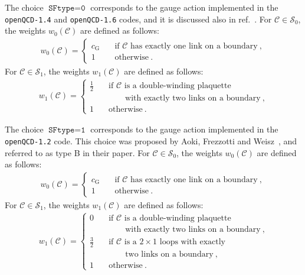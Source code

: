 \documentclass[11pt,fleqn]{article}
\begin{document}
The choice $\texttt{SFtype}=\texttt{0}$ corresponds to the gauge action implemented in the \texttt{openQCD-1.4} and \texttt{openQCD-1.6} codes, and it is discussed also in ref.~\cite{openQCD:gauge_action}. For $\mathcal{C} \in \mathcal{S}_0$, the weights $w_0(\mathcal{C})$ are defined as follows:
\begin{gather}
   w_0(\mathcal{C}) =
   \begin{cases}
      c_\text{G} \quad & \text{if $\mathcal{C}$ has exactly one link on a boundary} \ , \\
      1 & \text{otherwise} \ .
   \end{cases}
\end{gather}
For $\mathcal{C} \in \mathcal{S}_1$, the weights $w_1(\mathcal{C})$ are defined as follows:
\begin{gather}
   w_1(\mathcal{C}) =
   \begin{cases}
      \frac{1}{2} \quad & \text{if $\mathcal{C}$ is a double-winding plaquette} \\
      & \qquad \text{with exactly two links on a boundary} \ , \\
      1 & \text{otherwise} \ .
   \end{cases}
\end{gather}

The choice $\texttt{SFtype}=\texttt{1}$ corresponds to the gauge action implemented in the \texttt{openQCD-1.2} code. This choice was proposed by Aoki, Frezzotti and Weisz~\cite{Aoki:1998qd}, and referred to as type B in their paper. For $\mathcal{C} \in \mathcal{S}_0$, the weights $w_0(\mathcal{C})$ are defined as follows:
\begin{gather}
   w_0(\mathcal{C}) =
   \begin{cases}
      c_\text{G} \quad & \text{if $\mathcal{C}$ has exactly one link on a boundary} \ , \\
      1 & \text{otherwise} \ .
   \end{cases}
\end{gather}
For $\mathcal{C} \in \mathcal{S}_1$, the weights $w_1(\mathcal{C})$ are defined as follows:
\begin{gather}
   w_1(\mathcal{C}) =
   \begin{cases}
      0 \quad & \text{if $\mathcal{C}$ is a double-winding plaquette} \\
      & \qquad \text{with exactly two links on a boundary} \ , \\
      \frac{3}{2} \quad & \text{if $\mathcal{C}$ is a $2 \times 1$ loops with exactly} \\
      & \qquad \text{two links on a boundary} \ , \\
      1 & \text{otherwise} \ .
   \end{cases}
\end{gather}
\end{document}
